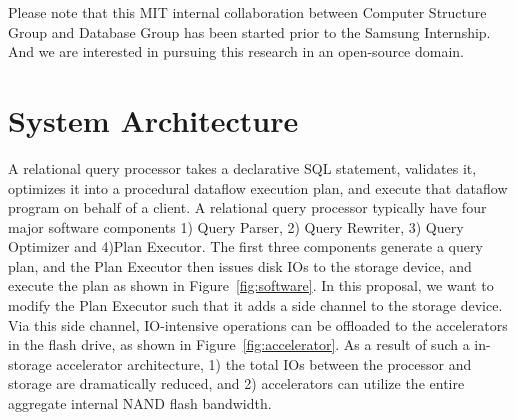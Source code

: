 \documentclass{article}
\begin{document}
Please note that this MIT internal collaboration between Computer Structure Group and Database Group has been started prior to the Samsung Internship. And we are interested in pursuing this research in an open-source domain.


\section{System Architecture}

A relational query processor takes a declarative SQL statement, validates it, optimizes it into a procedural dataflow execution plan, and execute that dataflow program on behalf of a client.
A relational query processor typically have four major software components 1) Query Parser, 2) Query Rewriter, 3) Query Optimizer and 4)Plan Executor.
The first three components generate a query plan, and the Plan Executor then issues disk IOs to the storage device, and execute the plan as shown in Figure~\ref{fig:software}.
In this proposal, we want to modify the Plan Executor such that it adds a side channel to the storage device.
Via this side channel, IO-intensive operations can be offloaded to the accelerators in the flash drive, as shown in Figure~\ref{fig:accelerator}.
As a result of such a in-storage accelerator architecture, 1) the total IOs between the processor and storage are dramatically reduced, and 2) accelerators can utilize the entire aggregate internal NAND flash bandwidth.
\end{document}
